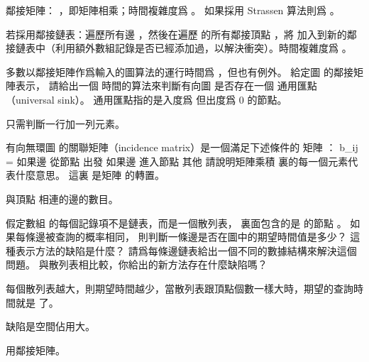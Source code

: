 \startANSWER
鄰接矩陣： ，即矩陣相乘；時間複雜度爲 。
如果採用 Strassen 算法則爲 。

若採用鄰接鏈表：遍歷所有邊 ，然後在遍歷  的所有鄰接頂點 ，將  加入到新的鄰接鏈表中（利用額外數組記錄是否已經添加過，以解決衝突）。時間複雜度爲 。
\stopANSWER

\startEXERCISE
多數以鄰接矩陣作爲輸入的圖算法的運行時間爲 ，但也有例外。
給定圖  的鄰接矩陣表示，
請給出一個  時間的算法來判斷有向圖  是否存在一個 {\EMP 通用匯點}（universal sink）。
通用匯點指的是入度爲  但出度爲 0 的節點。
\stopEXERCISE

\startANSWER
只需判斷一行加一列元素。
\stopANSWER

\startEXERCISE
有向無環圖  的{\EMP 關聯矩陣}（incidence matrix）是一個滿足下述條件的  矩陣 ：
\startformula
b_{ij} = \startcases
{} \NC 如果邊  從節點  出發 \NR
{} \NC 如果邊  進入節點  \NR
{} \NC 其他 \NR
\stopcases
\stopformula
請說明矩陣乘積  裏的每一個元素代表什麼意思。
這裏  是矩陣  的轉置。
\stopEXERCISE

\startANSWER
與頂點  相連的邊的數目。
\stopANSWER

\startEXERCISE
假定數組  的每個記錄項不是鏈表，而是一個散列表，
裏面包含的是  的節點 。
如果每條邊被查詢的概率相同，
則判斷一條邊是否在圖中的期望時間值是多少？
這種表示方法的缺陷是什麼？
請爲每條邊鏈表給出一個不同的數據結構來解決這個問題。
與散列表相比較，你給出的新方法存在什麼缺陷嗎？
\stopEXERCISE

\startANSWER
每個散列表越大，則期望時間越少，當散列表跟頂點個數一樣大時，期望的查詢時間就是  了。

缺陷是空間佔用大。

用鄰接矩陣。
\stopANSWER

\stopsection
